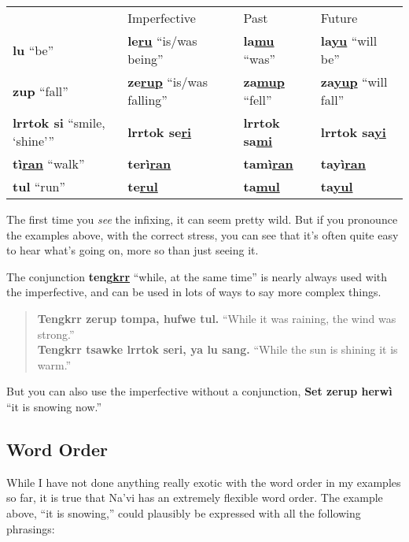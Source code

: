 \documentclass[nofonts]{tufte-handout}
\newcommand{\N}[1]{\textbf{\textcolor{navi}{#1}}}
\begin{document}
\medskip
\begin{tabular}{llll}
  & Imperfective & Past & Future \\
\N{lu} ``be'' & \N{le\uline{ru}} ``is/was being'' & \N{la\uline{mu}}
    ``was'' & \N{la\uline{yu}} ``will be'' \\
\N{zup} ``fall'' & \N{ze\uline{rup}} ``is/was falling'' & \N{za\uline{mup}}
    ``fell'' & \N{za\uline{yup}} ``will fall''\\
\N{lrrtok si} ``smile, `shine''' & \N{lrrtok se\uline{ri}} &
    \N{lrrtok sa\uline{mi}} & \N{lrrtok sa\uline{yi}} \\
\N{tì\uline{ran}} ``walk'' & \N{terì\uline{ran}} & \N{tamì\uline{ran}} &
    \N{tayì\uline{ran}} \\
\N{tul} ``run'' & \N{te\uline{rul}} & \N{ta\uline{mul}}
     & \N{ta\uline{yul}} 
\end{tabular}
\medskip

\noindent The first time you \textit{see} the infixing,
it can seem pretty wild.  But if you pronounce the examples above,
with the correct stress, you can see that it's often quite easy to
hear what's going on, more so than just seeing it.

The conjunction \N{teng\uline{krr}} ``while, at the same time'' is
nearly always used with the imperfective, and can be used in lots of
ways to say more complex things.

\begin{quotation}
\noindent\N{Tengkrr zerup tompa, hufwe tul.} ``While it was raining,
the wind was strong.''\\

\noindent\N{Tengkrr tsawke lrrtok seri, ya lu sang.} ``While the sun is
shining it is warm.''
\end{quotation}

\noindent But you can also use the imperfective without a conjunction,
\N{Set zerup herwì} ``it is snowing now.''

\subsection*{Word Order}
While I have not done anything really exotic with the word order in my
examples so far, it is true that Na'vi has an extremely flexible word
order.  The example above, ``it is snowing,'' could plausibly be
expressed with all the following phrasings:
\end{document}
